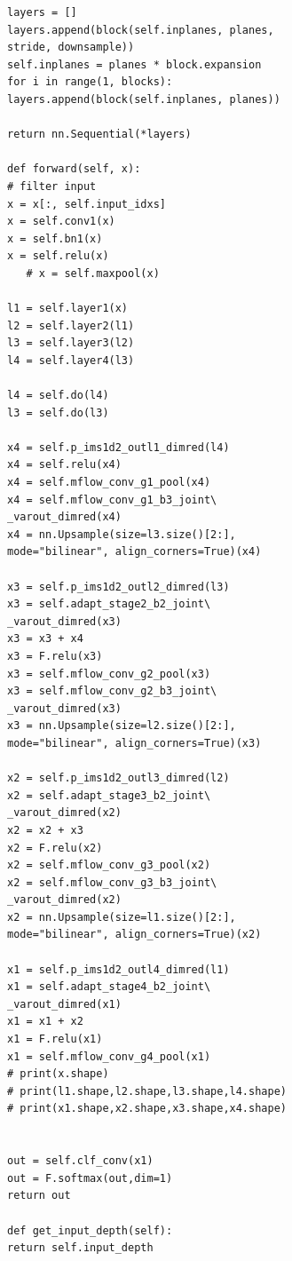 \documentclass[final]{cvpr}
\begin{document}
\begin{lstlisting}
layers = []
layers.append(block(self.inplanes, planes,
stride, downsample))
self.inplanes = planes * block.expansion
for i in range(1, blocks):
layers.append(block(self.inplanes, planes))

return nn.Sequential(*layers)

def forward(self, x):
# filter input
x = x[:, self.input_idxs]
x = self.conv1(x)
x = self.bn1(x)
x = self.relu(x)
   # x = self.maxpool(x)

l1 = self.layer1(x)
l2 = self.layer2(l1)
l3 = self.layer3(l2)
l4 = self.layer4(l3)

l4 = self.do(l4)
l3 = self.do(l3)

x4 = self.p_ims1d2_outl1_dimred(l4)
x4 = self.relu(x4)
x4 = self.mflow_conv_g1_pool(x4)
x4 = self.mflow_conv_g1_b3_joint\
_varout_dimred(x4)
x4 = nn.Upsample(size=l3.size()[2:],
mode="bilinear", align_corners=True)(x4)

x3 = self.p_ims1d2_outl2_dimred(l3)
x3 = self.adapt_stage2_b2_joint\
_varout_dimred(x3)
x3 = x3 + x4
x3 = F.relu(x3)
x3 = self.mflow_conv_g2_pool(x3)
x3 = self.mflow_conv_g2_b3_joint\
_varout_dimred(x3)
x3 = nn.Upsample(size=l2.size()[2:],
mode="bilinear", align_corners=True)(x3)

x2 = self.p_ims1d2_outl3_dimred(l2)
x2 = self.adapt_stage3_b2_joint\
_varout_dimred(x2)
x2 = x2 + x3
x2 = F.relu(x2)
x2 = self.mflow_conv_g3_pool(x2)
x2 = self.mflow_conv_g3_b3_joint\
_varout_dimred(x2)
x2 = nn.Upsample(size=l1.size()[2:],
mode="bilinear", align_corners=True)(x2)

x1 = self.p_ims1d2_outl4_dimred(l1)
x1 = self.adapt_stage4_b2_joint\
_varout_dimred(x1)
x1 = x1 + x2
x1 = F.relu(x1)
x1 = self.mflow_conv_g4_pool(x1)
# print(x.shape)
# print(l1.shape,l2.shape,l3.shape,l4.shape)
# print(x1.shape,x2.shape,x3.shape,x4.shape)


out = self.clf_conv(x1)
out = F.softmax(out,dim=1)
return out

def get_input_depth(self):
return self.input_depth
\end{lstlisting}  
\label{app:A}

{\small


}
\end{document}
